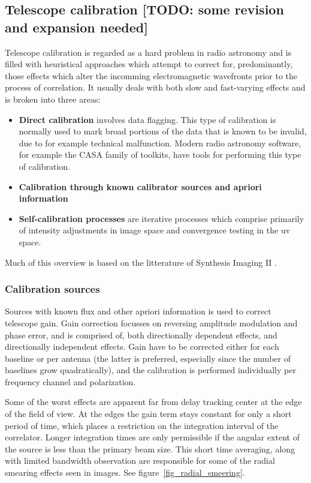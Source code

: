 \documentclass[a4paper,10pt]{report}
\begin{document}
\subsection{Telescope calibration [TODO: some revision and expansion needed]}
Telescope calibration is regarded as a hard problem in radio astronomy and is filled with heuristical approaches which attempt to correct for, predominantly, those effects which alter the
incomming electromagnetic wavefronts prior to the process of correlation. It usually deals with both slow and fast-varying effects and is broken into three areas:
\begin{itemize}
 \item \textbf{Direct calibration} involves data flagging. This type of calibration is normally used to mark broad portions of the data that is known to be invalid, due to for example
 technical malfunction. Modern radio astronomy software, for example the CASA family of toolkits, have tools for performing this type of calibration.
 \item \textbf{Calibration through known calibrator sources and apriori information} 
 \item \textbf{Self-calibration processes} are iterative processes which comprise primarily of intensity adjustments in image space and convergence testing in the uv space.
\end{itemize}

Much of this overview is based on the litterature of Synthesis Imaging II \cite[Lectures 5, 8 and 10]{taylor1999synthesis}.

\subsubsection{Calibration sources}
 Sources with known flux and other apriori information is used to correct telescope gain. Gain correction focusses on reversing amplitude modulation and phase error, and is 
 comprised of, both directionally dependent effects, and directionally independent effects. Gain have to be corrected either for each baseline or per antenna (the latter is 
 preferred, especially since the number of baselines grow quadratically), and the calibration is performed individually per frequency channel and polarization.
 
 Some of the worst effects are apparent far from delay tracking center at the edge of the field of view. At the edges the gain term stays constant for only a short period of time, which
 places a restriction on the integration interval of the correlator. Longer integration times are only permissible if the angular extent of the source is less than the primary beam size.
 This short time averaging, along with limited bandwidth observation are responsible for some of the radial smearing effects seen in images. See figure~\ref{fig_radial_smeering}.
 
\end{document}
